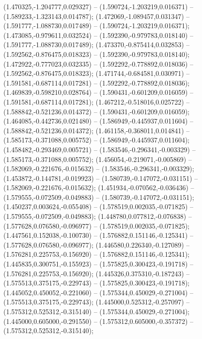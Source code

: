  (1.470325,-1.204777,0.029327) -- (1.590724,-1.203219,0.016371) -- (1.589233,-1.323143,0.014787);
 (1.472069,-1.089457,0.031347) -- (1.591777,-1.088730,0.017489) -- (1.590724,-1.203219,0.016371);
 (1.473085,-0.979611,0.032524) -- (1.592390,-0.979783,0.018140) -- (1.591777,-1.088730,0.017489);
 (1.473370,-0.875414,0.032853) -- (1.592562,-0.876475,0.018323) -- (1.592390,-0.979783,0.018140);
 (1.472922,-0.777023,0.032335) -- (1.592292,-0.778892,0.018036) -- (1.592562,-0.876475,0.018323);
 (1.471744,-0.684581,0.030971) -- (1.591581,-0.687114,0.017281) -- (1.592292,-0.778892,0.018036);
 (1.469839,-0.598210,0.028764) -- (1.590431,-0.601209,0.016059) -- (1.591581,-0.687114,0.017281);
 (1.467212,-0.518016,0.025722) -- (1.588842,-0.521236,0.014372) -- (1.590431,-0.601209,0.016059);
 (1.464085,-0.442736,0.021480) -- (1.586949,-0.445937,0.011604) -- (1.588842,-0.521236,0.014372);
 (1.461158,-0.368011,0.014841) -- (1.585173,-0.371088,0.005752) -- (1.586949,-0.445937,0.011604);
 (1.458482,-0.293469,0.005721) -- (1.583546,-0.296341,-0.003329) -- (1.585173,-0.371088,0.005752);
 (1.456054,-0.219071,-0.005869) -- (1.582069,-0.221676,-0.015632) -- (1.583546,-0.296341,-0.003329);
 (1.453872,-0.144781,-0.019923) -- (1.580739,-0.147072,-0.031151) -- (1.582069,-0.221676,-0.015632);
 (1.451934,-0.070562,-0.036436) -- (1.579555,-0.072509,-0.049883) -- (1.580739,-0.147072,-0.031151);
 (1.450237,0.003624,-0.055408) -- (1.578519,0.002035,-0.071825) -- (1.579555,-0.072509,-0.049883);
 (1.448780,0.077812,-0.076838) -- (1.577628,0.076580,-0.096977) -- (1.578519,0.002035,-0.071825);
 (1.447561,0.152038,-0.100730) -- (1.576882,0.151146,-0.125341) -- (1.577628,0.076580,-0.096977);
 (1.446580,0.226340,-0.127089) -- (1.576281,0.225753,-0.156920) -- (1.576882,0.151146,-0.125341);
 (1.445835,0.300751,-0.155923) -- (1.575825,0.300423,-0.191718) -- (1.576281,0.225753,-0.156920);
 (1.445326,0.375310,-0.187243) -- (1.575513,0.375175,-0.229743) -- (1.575825,0.300423,-0.191718);
 (1.445052,0.450052,-0.221060) -- (1.575344,0.450029,-0.271004) -- (1.575513,0.375175,-0.229743);
 (1.445000,0.525312,-0.257097) -- (1.575312,0.525312,-0.315140) -- (1.575344,0.450029,-0.271004);
 (1.445000,0.605000,-0.291550) -- (1.575312,0.605000,-0.357372) -- (1.575312,0.525312,-0.315140);
